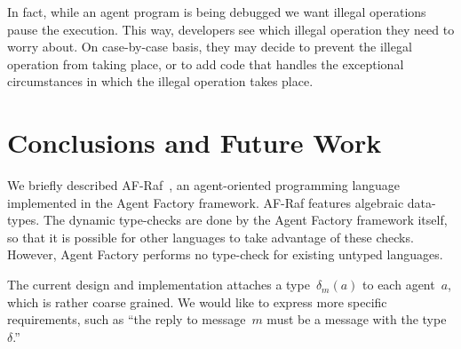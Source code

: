 \documentclass[preprint]{sigplanconf} %
\theoremstyle{remark}
\begin{document}
In fact, while an agent program is being debugged we want illegal
operations pause the execution. This way, developers see which illegal
operation they need to worry about. On case-by-case basis, they may decide
to prevent the illegal operation from taking place, or to add code that
handles the exceptional circumstances in which the illegal operation takes
place.

%
%
\section{Conclusions and Future Work} \label{sec:conclusions} %

We briefly described AF-Raf~\cite{site:af-raf}, an agent-oriented
programming language implemented in the Agent Factory framework. AF-Raf
features algebraic data-types. The dynamic type-checks are done by the
Agent Factory framework itself, so that it is possible for other languages
to take advantage of these checks. However, Agent Factory performs no
type-check for existing untyped languages.

The current design and implementation attaches a type~$\delta_m(a)$ to each
agent~$a$, which is rather coarse grained. We would like to express more
specific requirements, such as ``the reply to message~$m$ must be a message
with the type~$\delta$.''
\end{document}
